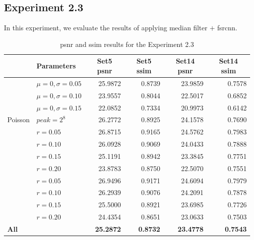 \subsection{Experiment 2.3}
In this experiment, we evaluate the results of applying median filter $+$ \gls{fsrcnn}.

\begin{table}[]
	\centering
	\begin{tabular}{|l|l|r|r|r|r|}
		\hline
		\rowcolor[HTML]{EFEFEF} 
		\multicolumn{1}{|c|}{\cellcolor[HTML]{EFEFEF}\textbf{Noise}} & \textbf{Parameters} & \multicolumn{1}{c|}{\cellcolor[HTML]{EFEFEF}\textbf{Set5 \gls{psnr}}} & \multicolumn{1}{c|}{\cellcolor[HTML]{EFEFEF}\textbf{Set5 \gls{ssim}}} & \multicolumn{1}{c|}{\cellcolor[HTML]{EFEFEF}\textbf{Set14 \gls{psnr}}} & \multicolumn{1}{c|}{\cellcolor[HTML]{EFEFEF}\textbf{Set14 \gls{ssim}}} \\ \hline
		\rowcolor[HTML]{FFFFFF} 
		\cellcolor[HTML]{EFEFEF} & $\mu=0, \sigma=0.05$ & 25.9872 & 0.8739 & 23.9859 & 0.7578 \\
		\rowcolor[HTML]{EFEFEF} 
		\cellcolor[HTML]{EFEFEF} & $\mu=0, \sigma=0.10$ & 23.9557 & 0.8044 & 22.5017 & 0.6852 \\
		\rowcolor[HTML]{FFFFFF} 
		\multirow{-3}{*}{\cellcolor[HTML]{EFEFEF}Gaussian} & $\mu=0, \sigma=0.15$ & 22.0852 & 0.7334 & 20.9973 & 0.6142 \\
		\rowcolor[HTML]{EFEFEF} 
		Poisson & $peak=2^8$ & 26.2772 & 0.8925 & 24.1578 & 0.7690 \\
		\rowcolor[HTML]{FFFFFF} 
		\cellcolor[HTML]{EFEFEF} & $r=0.05$ & 26.8715 & 0.9165 & 24.5762 & 0.7983 \\
		\rowcolor[HTML]{EFEFEF} 
		\cellcolor[HTML]{EFEFEF} & $r=0.10$ & 26.0928 & 0.9069 & 24.0433 & 0.7888 \\
		\rowcolor[HTML]{FFFFFF} 
		\cellcolor[HTML]{EFEFEF} & $r=0.15$ & 25.1191 & 0.8942 & 23.3845 & 0.7751 \\
		\rowcolor[HTML]{EFEFEF} 
		\multirow{-4}{*}{\cellcolor[HTML]{EFEFEF}Salt-and-pepper} & $r=0.20$ & 23.8783 & 0.8750 & 22.5070 & 0.7551 \\
		\rowcolor[HTML]{FFFFFF} 
		\cellcolor[HTML]{EFEFEF} & $r=0.05$ & 26.9496 & 0.9171 & 24.6094 & 0.7979 \\
		\rowcolor[HTML]{EFEFEF} 
		\cellcolor[HTML]{EFEFEF} & $r=0.10$ & 26.2939 & 0.9076 & 24.2091 & 0.7878 \\
		\rowcolor[HTML]{FFFFFF} 
		\cellcolor[HTML]{EFEFEF} & $r=0.15$ & 25.5000 & 0.8921 & 23.6985 & 0.7726 \\
		\rowcolor[HTML]{EFEFEF} 
		\multirow{-4}{*}{\cellcolor[HTML]{EFEFEF}Uniform} & $r=0.20$ & 24.4354 & 0.8651 & 23.0633 & 0.7503 \\
		\rowcolor[HTML]{FFFFFF} 
		\textbf{All} &  & \textbf{25.2872} & \textbf{0.8732} & \textbf{23.4778} & \textbf{0.7543}\\\hline
	\end{tabular}
	\caption{\gls{psnr} and \gls{ssim} results for the Experiment 2.3}
	\label{tab:experiment23}
\end{table}

